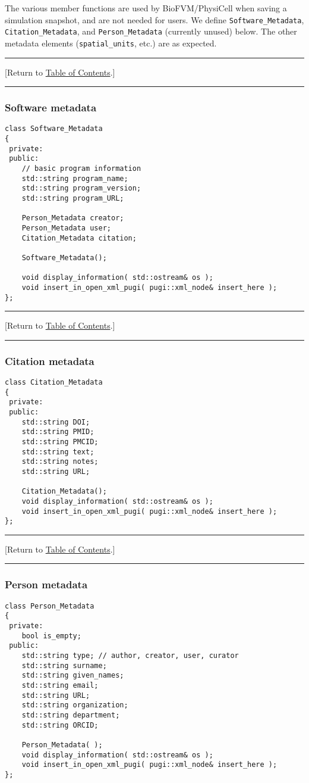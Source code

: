 \documentclass[12pt]{article}
\renewcommand{\v}{\verb}
\newcommand{\TOClink}{\begin{center}\hrule\vskip-10pt\phantom{.}\hfill[Return to \hyperlink{TOC}{Table of Contents}.]\hfill\phantom{.}\vskip3pt\hrule\end{center}}
\begin{document}
The various member functions are used by BioFVM/PhysiCell when saving a simulation 
snapshot, and are not needed for users.  
We define \v|Software_Metadata|, \v|Citation_Metadata|, 
and \v|Person_Metadata| (currently unused) below. The other metadata elements 
(\v|spatial_units|, etc.) are as expected. 

\TOClink 

\subsubsection{Software metadata}
\begin{verbatim}
class Software_Metadata
{
 private:
 public:
    // basic program information   
    std::string program_name; 
    std::string program_version; 
    std::string program_URL;
        
    Person_Metadata creator; 
    Person_Metadata user; 
    Citation_Metadata citation;
    
    Software_Metadata();
    
    void display_information( std::ostream& os ); 
    void insert_in_open_xml_pugi( pugi::xml_node& insert_here );         
};
\end{verbatim}

\TOClink 

\subsubsection{Citation metadata}
\begin{verbatim}
class Citation_Metadata
{
 private:
 public:
    std::string DOI;
    std::string PMID;
    std::string PMCID; 
    std::string text;
    std::string notes; 
    std::string URL; 
    
    Citation_Metadata();  
    void display_information( std::ostream& os );  
    void insert_in_open_xml_pugi( pugi::xml_node& insert_here );    
};
\end{verbatim}

\TOClink 

\subsubsection{Person metadata}
\begin{verbatim}
class Person_Metadata
{
 private: 
    bool is_empty; 
 public: 
    std::string type; // author, creator, user, curator 
    std::string surname;
    std::string given_names; 
    std::string email;
    std::string URL; 
    std::string organization; 
    std::string department; 
    std::string ORCID; 
    
    Person_Metadata( ); 
    void display_information( std::ostream& os );          
    void insert_in_open_xml_pugi( pugi::xml_node& insert_here );  
};
\end{verbatim}
\end{document}
